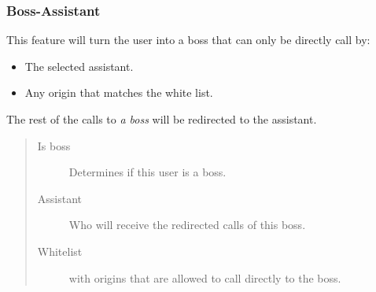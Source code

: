 \documentclass[letterpaper,10pt,english]{sphinxmanual}
\begin{document}
\subsubsection{Boss-Assistant}
\label{administration_portal/client/vpbx/users:boss-assistant}
This feature will turn the user into a boss that can only be directly call by:
\begin{itemize}
\item {} 
The selected assistant.

\item {} 
Any origin that matches the white list.

\end{itemize}

The rest of the calls to \emph{a boss} will be redirected to the assistant.
\begin{quote}
\begin{description}
\item[{Is boss}] \leavevmode
Determines if this user is a boss.

\item[{Assistant}] \leavevmode
Who will receive the redirected calls of this boss.

\item[{Whitelist}] \leavevmode
{\hyperref[administration_portal/client/vpbx/routing_tools/match_lists:match\string-lists]{}} with origins that are allowed to call directly to
the boss.

\end{description}
\end{quote}
\end{document}
